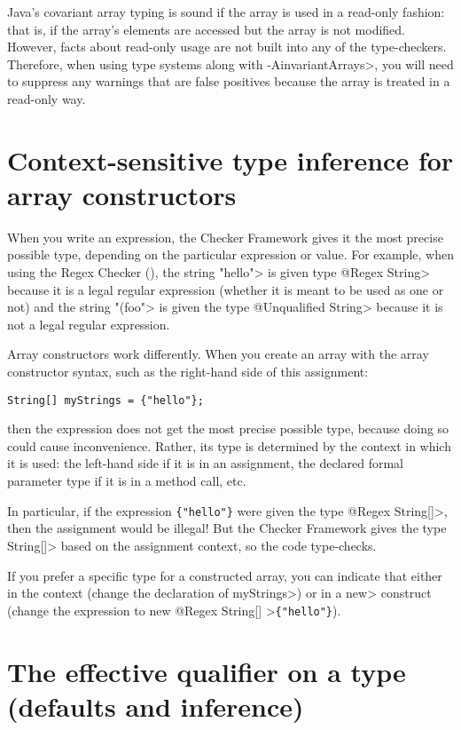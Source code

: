 Java's covariant array typing is sound if the array is used in a read-only
fashion:  that is, if the array's elements are accessed but the array is
not modified.  However, facts about read-only usage are not built into any of
the type-checkers.  Therefore, when using type systems
along with \<-AinvariantArrays>, you will need to suppress any warnings that
are false positives because the array is treated in a read-only way.


\section{Context-sensitive type inference for array constructors\label{array-context-sensitive}}

When you write an expression, the Checker Framework gives it the most
precise possible type, depending on the particular expression or value.
For example, when using the Regex Checker (),
the string \<"hello"> is given type \<@Regex String> because it is a legal
regular expression (whether it is meant to be used as one or not) and the
string \<"(foo"> is given the type \<@Unqualified String> because it is not
a legal regular expression.

Array constructors work differently.  When you create an array with the
array constructor syntax, such as the right-hand side of this assignment:

\begin{Verbatim}
String[] myStrings = {"hello"};
\end{Verbatim}

\noindent
then the expression does not get the most precise possible type, because
doing so could cause inconvenience.  Rather, its type is determined by the
context in which it is used:  the left-hand side if it is in an assignment,
the declared formal parameter type if it is in a method call, etc.

In particular, if the expression \verb|{"hello"}| were given the type
\<@Regex String[]>, then the assignment would be illegal!  But the Checker
Framework gives the type \<String[]> based on the assignment context, so the code
type-checks.

If you prefer a specific type for a constructed array, you can indicate
that either in the context (change the declaration of \<myStrings>) or in a
\<new> construct (change the expression to \<new @Regex String[] >\verb|{"hello"}|).


\section{The effective qualifier on a type (defaults and inference)\label{effective-qualifier}}

